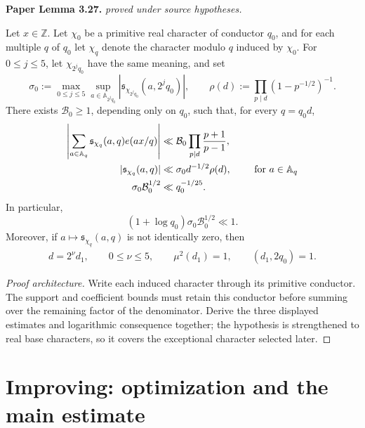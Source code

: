 \begin{lemma}
\label{conductor_refinement}
\leanok
\par\medskip\noindent\textbf{Paper Lemma 3.27.} \textit{proved under source hypotheses.}\par
Let \(x\in\mathbb Z\). Let $\chi_0$ be a primitive real character of conductor $q_0$, and for
each multiple $q$ of $q_0$ let $\chi_q$ denote the character modulo $q$
induced by $\chi_0$.  For \(0\leq j\leq5\), let
\(\chi_{2^jq_0}\) have the same meaning, and set
\[
 \sigma_0:=
 \max_{0\leq j\leq5}
 \sup_{a\in\mathbb A_{2^jq_0}}
 |\mathfrak s_{\chi_{2^jq_0}}(a,2^jq_0)|,
 \qquad
 \rho(d):=\prod_{p\mid d}(1-p^{-1/2})^{-1}.
\]
There exists $\mathcal B_0\geq1$, depending only on $q_0$, such that,
for every \(q=q_0d\),
\begin{align}
 \left|
 \sum_{a\in\mathbb A_q}
 \mathfrak s_{\chi_q}(a,q)e(ax/q)
 \right|
 &\ll
 \mathcal B_0\prod_{p\mid d}\frac{p+1}{p-1},\notag\\
 |\mathfrak s_{\chi_q}(a,q)|
 &\ll \sigma_0d^{-1/2}\rho(d),
 \qquad \textup{ for } a\in \mathbb{A}_q\\
  \sigma_0\mathcal B_0^{1/2}&\ll q_0^{-1/25}.
\end{align}
In particular,
\[
 (1+\log q_0)\sigma_0\mathcal B_0^{1/2}\ll1.
\]
Moreover, if
\(a\mapsto\mathfrak s_{\chi_q}(a,q)\) is not identically zero, then
\begin{align}
    d=2^\nu d_1,\qquad
 0\leq\nu\leq5,\qquad
 \mu^2(d_1)=1,\qquad
 (d_1,2q_0)=1.
\end{align}
\end{lemma}
\begin{proof}[Proof architecture]
\leanok
Write each induced character through its primitive conductor. The support and coefficient bounds must retain this conductor before summing over the remaining factor of the denominator. Derive the three displayed estimates and logarithmic consequence together; the hypothesis is strengthened to real base characters, so it covers the exceptional character selected later.
\end{proof}

\section{Improving: optimization and the main estimate}

